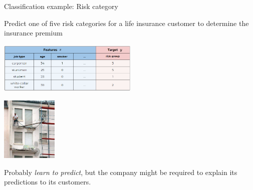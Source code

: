 \begin{vbframe}{Classification example: Risk category}

  Predict one of five risk categories for a life insurance customer to determine the insurance premium 
\begin{center}

    \includegraphics[width=0.5\textwidth]{figure_man/ml-basics-supervised-task-insurance-data.png} 

\lz

  \includegraphics[width = 0.2\textwidth]{figure_man/classif_ex_placeholder.jpg} 
\end{center}

Probably \textit{learn to predict}, but the company might be required to explain
its predictions to its customers.

\end{vbframe}




% 
% 
%   
%   
% 
%   
% 




